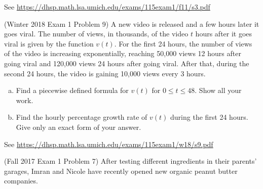 \documentclass[11pt]{exam}
\begin{document}
\begin{questions}
\begin{solution}
  See \href{https://dhsp.math.lsa.umich.edu/exams/115exam1/f11/s3.pdf}{https://dhsp.math.lsa.umich.edu/exams/115exam1/f11/s3.pdf}
\end{solution}
\vspace{1in}
\question (Winter 2018 Exam 1 Problem 9)
A new video is released and a few hours later it goes viral. The number of views, in thousands, of the video \(t\) hours after it goes viral is given by the function $v(t)$. For the first 24 hours, the number of views of the video is increasing exponentially, reaching 50,000 views 12 hours after going viral and 120,000 views 24 hours after going viral. After that, during the second 24 hours, the video is gaining 10,000 views every 3 hours.
\begin{enumerate}[(a)]
\item Find a piecewise defined formula for $v(t)$ for $0 \leqslant t \leqslant 48$. Show all your work.

\item Find the hourly percentage growth rate of \(v(t)\) during the
  first 24 hours. Give only an exact form of your answer.
\end{enumerate}
\begin{solution}
  See \href{https://dhsp.math.lsa.umich.edu/exams/115exam1/w18/s9.pdf}{https://dhsp.math.lsa.umich.edu/exams/115exam1/w18/s9.pdf}
\end{solution}
\vspace{1in}
\question (Fall 2017 Exam 1 Problem 7)
After testing different ingredients in their parents’ garages, Imran and Nicole have
recently opened new organic peanut butter companies.
\begin{parts}

\end{parts}
\end{questions}
\end{document}
